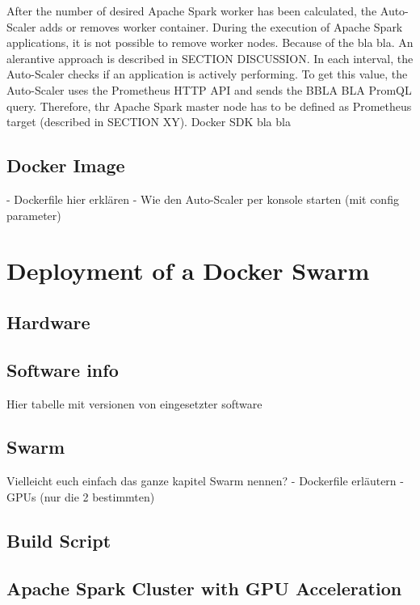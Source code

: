 
After the number of desired Apache Spark worker has been calculated, the Auto-Scaler adds or removes worker container.
During the execution of Apache Spark applications, it is not possible to remove worker nodes. Because of the bla bla. An alerantive approach is described in SECTION DISCUSSION.
In each interval, the Auto-Scaler checks if an application is actively performing. To get this value, the Auto-Scaler uses the Prometheus HTTP API and sends the BBLA BLA PromQL query. Therefore, thr Apache Spark master node has to be defined as Prometheus target (described in SECTION XY).
Docker SDK bla bla


\subsection{Docker Image}
- Dockerfile hier erklären
- Wie den Auto-Scaler per konsole starten (mit config parameter)


\section{Deployment of a Docker Swarm}


\subsection{Hardware}


\subsection{Software info}
Hier tabelle mit versionen von eingesetzter software


\subsection{Swarm}
Vielleicht euch einfach das ganze kapitel Swarm nennen?
- Dockerfile erläutern
- GPUs (nur die 2 bestimmten)


\subsection{Build Script}


\subsection{Apache Spark Cluster with GPU Acceleration}

